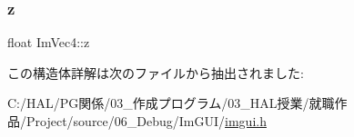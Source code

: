 \mbox{\label{struct_im_vec4_aba6a75356917a28c967954bb29133a1a}} 
\subsubsection{\texorpdfstring{z}{z}}
{\footnotesize\ttfamily float Im\+Vec4\+::z}



この構造体詳解は次のファイルから抽出されました\+:\begin{DoxyCompactItemize}
\item 
C\+:/\+H\+A\+L/\+P\+G関係/03\+\_\+作成プログラム/03\+\_\+\+H\+A\+L授業/就職作品/\+Project/source/06\+\_\+\+Debug/\+Im\+G\+U\+I/\mbox{\hyperlink{imgui_8h}{imgui.\+h}}\end{DoxyCompactItemize}
